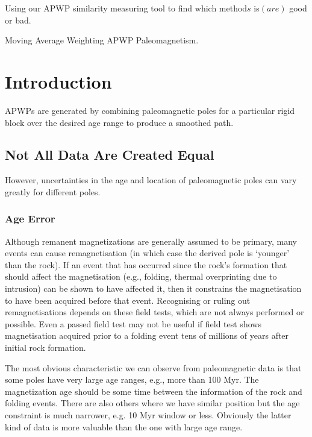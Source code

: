 \begin{summary}
Using our APWP similarity measuring tool to find which method\(s\) is$(are)$
good or bad.
\end{summary}

\begin{keywords}
  Moving Average \textendash{} Weighting \textendash{} APWP \textendash{}
  Paleomagnetism.
\end{keywords}

\section{Introduction}

APWPs are generated by combining paleomagnetic poles for a particular rigid
block over the desired age range to produce a smoothed path.

\subsection{Not All Data Are Created Equal}

However, uncertainties in the age and location of paleomagnetic poles can vary
greatly for different poles.

\subsubsection{Age Error}

Although remanent magnetizations are generally assumed to be primary, many
events can cause remagnetisation (in which case the derived pole is `younger'
than the rock). If an event that has occurred since the rock's formation that
should affect the magnetisation (e.g., folding, thermal overprinting due to
intrusion) can be shown to have affected it, then it constrains the
magnetisation to have been acquired before that event. Recognising or ruling
out remagnetisations depends on these field tests, which are not always
performed or possible. Even a passed field test may not be useful if field test
shows magnetisation acquired prior to a folding event tens of millions of years
after initial rock formation.

The most obvious characteristic we can observe from paleomagnetic data is that
some poles have very large age ranges, e.g., more than 100 Myr. The
magnetization age should be some time between the information of the rock and
folding events. There are also others where we have similar position but the
age constraint is much narrower, e.g. 10 Myr window or less. Obviously the
latter kind of data is more valuable than the one with large age range.

